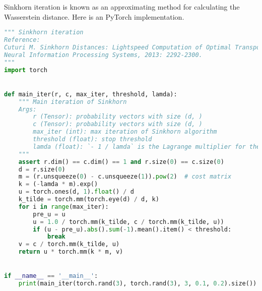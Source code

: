 \documentclass[a4paper,11pt]{article}
\begin{document}
Sinkhorn iteration is known as an approximating method for calculating the Wasserstein distance. Here is an PyTorch implementation.

\begin{lstlisting}[language=Python]
""" Sinkhorn iteration
Reference:
Cuturi M. Sinkhorn Distances: Lightspeed Computation of Optimal Transport[C].
Neural Information Processing Systems, 2013: 2292-2300.
"""
import torch


def main_iter(r, c, max_iter, threshold, lamda):
    """ Main iteration of Sinkhorn
    Args:
        r (Tensor): probability vectors with size (d, )
        c (Tensor): probability vectors with size (d, )
        max_iter (int): max iteration of Sinkhorn algorithm
        threshold (float): stop threshold
        lamda (float): `- 1 / lamda` is the Lagrange multiplier for the entropy
    """
    assert r.dim() == c.dim() == 1 and r.size(0) == c.size(0)
    d = r.size(0)
    m = (r.unsqueeze(0) - c.unsqueeze(1)).pow(2)  # cost matrix
    k = (-lamda * m).exp()
    u = torch.ones(d, 1).float() / d
    k_tilde = torch.mm(torch.eye(d) / d, k)
    for i in range(max_iter):
        pre_u = u
        u = 1.0 / torch.mm(k_tilde, c / torch.mm(k_tilde, u))
        if (u - pre_u).abs().sum(-1).mean().item() < threshold:
            break
    v = c / torch.mm(k_tilde, u)
    return u * torch.mm(k * m, v)


if __name__ == '__main__':
    print(main_iter(torch.rand(3), torch.rand(3), 3, 0.1, 0.2).size())
\end{lstlisting}
\end{document}
